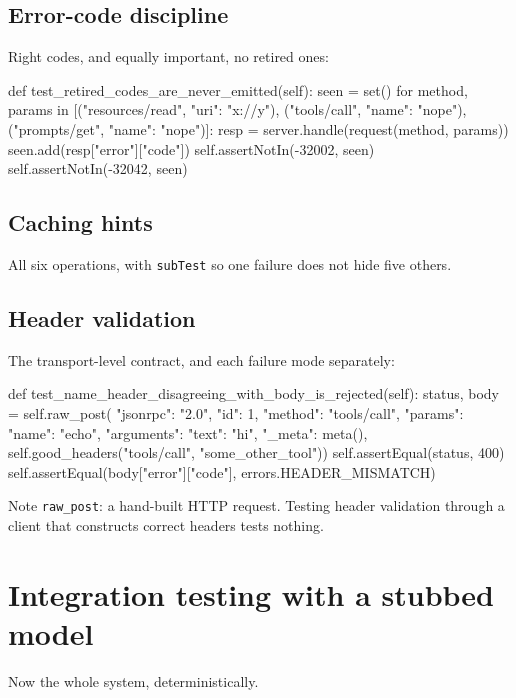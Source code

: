 \subsection{Error-code discipline}

Right codes, and equally important, no retired ones:

\begin{py}
def test_retired_codes_are_never_emitted(self):
    seen = set()
    for method, params in [("resources/read", {"uri": "x://y"}),
                           ("tools/call", {"name": "nope"}),
                           ("prompts/get", {"name": "nope"})]:
        resp = server.handle(request(method, params))
        seen.add(resp["error"]["code"])
    self.assertNotIn(-32002, seen)
    self.assertNotIn(-32042, seen)
\end{py}

\subsection{Caching hints}

All six operations, with \texttt{subTest} so one failure does not hide five
others.

\subsection{Header validation}

The transport-level contract, and each failure mode separately:

\begin{py}
def test_name_header_disagreeing_with_body_is_rejected(self):
    status, body = self.raw_post(
        {"jsonrpc": "2.0", "id": 1, "method": "tools/call",
         "params": {"name": "echo", "arguments": {"text": "hi"},
                    "_meta": meta()}},
        self.good_headers("tools/call", "some_other_tool"))
    self.assertEqual(status, 400)
    self.assertEqual(body["error"]["code"], errors.HEADER_MISMATCH)
\end{py}

Note \texttt{raw\_post}: a hand-built HTTP request. Testing header validation
through a client that constructs correct headers tests nothing.

\section{Integration testing with a stubbed model}

Now the whole system, deterministically.

